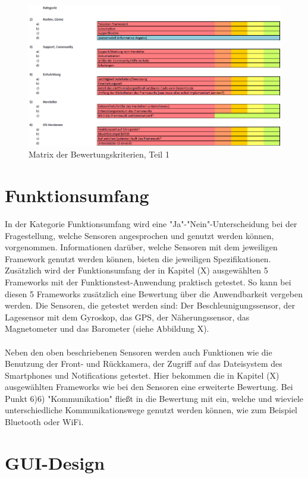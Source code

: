 \begin{figure}[h]
	\centering
	\includegraphics[width=1\textwidth]{Bilder/Bewertungsmatrix_1.PNG}
	\caption{Matrix der Bewertungskriterien, Teil 1}
	\label{fig:Bewertungskriterien_1}
\end{figure}

\section{Funktionsumfang}

In der Kategorie Funktionsumfang wird eine "Ja"-"Nein"-Unterscheidung bei der Fragestellung, welche Sensoren angesprochen und genutzt werden können, vorgenommen. Informationen darüber, welche Sensoren mit dem jeweiligen Framework genutzt werden können, bieten die jeweiligen Spezifikationen. Zusätzlich wird der Funktionsumfang der in Kapitel (X) ausgewählten 5 Frameworks mit der Funktionstest-Anwendung praktisch getestet. So kann bei diesen 5 Frameworks zusätzlich eine Bewertung über die Anwendbarkeit vergeben werden. Die Sensoren, die getestet werden sind: Der Beschleunigungssensor, der Lagesensor mit dem Gyroskop, das GPS, der Näherungssensor, das Magnetometer und das Barometer (siehe Abbildung X). 
\\
\\
Neben den oben beschriebenen Sensoren werden auch Funktionen wie die Benutzung der Front- und Rückkamera, der Zugriff auf das Dateisystem des Smartphones und Notifications getestet. Hier bekommen die in Kapitel (X) ausgewählten Frameworks wie bei den Sensoren eine erweiterte Bewertung. Bei Punkt 6)6) "Kommunikation" fließt in die Bewertung mit ein, welche und wieviele unterschiedliche Kommunikationswege genutzt werden können, wie zum Beispiel Bluetooth oder WiFi. 

\section{GUI-Design}

